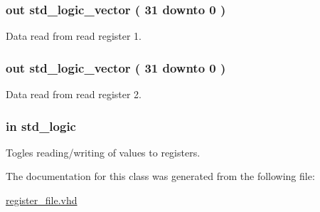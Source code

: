 \hypertarget{classregister__file_aef4e31f5d5b779c9df8f6303cae69fb9}{
\subsubsection[{\-Read\-\_\-data\-\_\-1}]{ {\bfseries out } {\bfseries std\-\_\-logic\-\_\-vector (   31    downto    0  ) } }}\label{classregister__file_aef4e31f5d5b779c9df8f6303cae69fb9}


\-Data read from read register 1. 

\hypertarget{classregister__file_af0a7789b9c8f26a47416d35994c4a904}{
\subsubsection[{\-Read\-\_\-data\-\_\-2}]{ {\bfseries out } {\bfseries std\-\_\-logic\-\_\-vector (   31    downto    0  ) } }}\label{classregister__file_af0a7789b9c8f26a47416d35994c4a904}


\-Data read from read register 2. 

\hypertarget{classregister__file_ad8219ae15bef1c8943970162a36feced}{
\subsubsection[{write\-\_\-enable}]{ {\bfseries in } {\bfseries std\-\_\-logic } }}\label{classregister__file_ad8219ae15bef1c8943970162a36feced}


\-Togles reading/writing of values to registers. 



\-The documentation for this class was generated from the following file\-:\begin{DoxyCompactItemize}
\item 
\hyperlink{register__file_8vhd}{register\-\_\-file.\-vhd}\end{DoxyCompactItemize}
